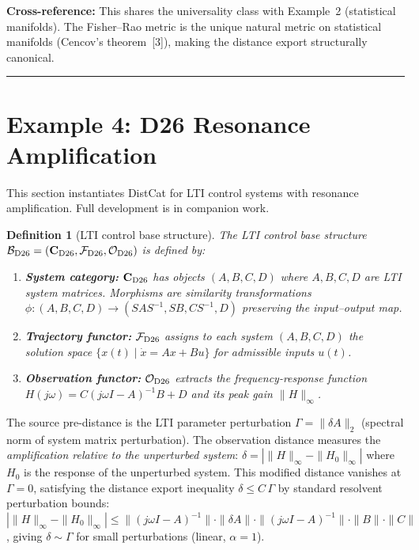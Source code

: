 \documentclass[
]{article}
\newtheorem{definition}[theorem]{Definition}
\begin{document}
\textbf{Cross-reference:} This shares the universality class with Example~2 (statistical manifolds). The Fisher--Rao metric is the unique natural metric on statistical manifolds (Cencov's theorem~[3]), making the distance export structurally canonical.

\begin{center}\rule{0.5\linewidth}{0.5pt}\end{center}


\section{Example 4: D26 Resonance Amplification}\label{sec:example4-d26}

This section instantiates DistCat for LTI control systems with resonance amplification. Full development is in companion work.

\begin{definition}[LTI control base structure]\label{def:base-d26}
The LTI control base structure $\mathcal{B}_{\rm D26} = (\mathbf{C}_{\rm D26}, \mathcal{F}_{\rm D26}, \mathcal{O}_{\rm D26})$ is defined by:
\begin{enumerate}
\item \textbf{System category:} $\mathbf{C}_{\rm D26}$ has objects $(A, B, C, D)$ where $A, B, C, D$ are LTI system matrices. Morphisms are similarity transformations $\phi: (A, B, C, D) \to (SAS^{-1}, SB, CS^{-1}, D)$ preserving the input--output map.
\item \textbf{Trajectory functor:} $\mathcal{F}_{\rm D26}$ assigns to each system $(A, B, C, D)$ the solution space $\{x(t) \mid \dot{x} = Ax + Bu\}$ for admissible inputs $u(t)$.
\item \textbf{Observation functor:} $\mathcal{O}_{\rm D26}$ extracts the frequency-response function $H(j\omega) = C(j\omega I - A)^{-1}B + D$ and its peak gain $\|H\|_\infty$.
\end{enumerate}
\end{definition}

The source pre-distance is the LTI parameter perturbation $\Gamma = \|\delta A\|_2$ (spectral norm of system matrix perturbation). The observation distance measures the \textit{amplification relative to the unperturbed system}: $\delta = |\|H\|_\infty - \|H_0\|_\infty|$ where $H_0$ is the response of the unperturbed system. This modified distance vanishes at $\Gamma = 0$, satisfying the distance export inequality $\delta \leq C\, \Gamma$ by standard resolvent perturbation bounds:
$|\|H\|_\infty - \|H_0\|_\infty| \leq \|(j\omega I - A)^{-1}\| \cdot \|\delta A\| \cdot \|(j\omega I - A)^{-1}\| \cdot \|B\| \cdot \|C\|$, giving $\delta \sim \Gamma$ for small perturbations (linear, $\alpha = 1$).
\end{document}
